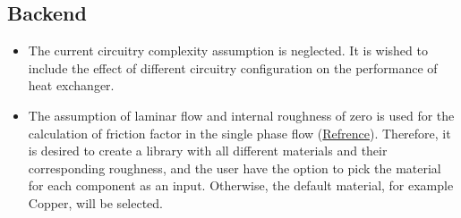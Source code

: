 \documentclass[]{article}
\begin{document}
\subsection{Backend}
\begin{itemize}
\item The current circuitry complexity assumption is neglected. It is wished to include the effect of different circuitry configuration on the performance of heat exchanger.
\item The assumption of laminar flow and internal roughness of zero is used for the calculation of friction factor in the single phase flow (\href{https://github.com/bo3mrh/ACHP-1/blob/master/ACHP/Correlations.py#L477}{Refrence}). Therefore, it is desired to create a library with all different materials and their corresponding roughness, and the user have the option to pick the material for each component as an input. Otherwise, the default material, for example Copper, will be selected.
\end{itemize}
\end{document}

